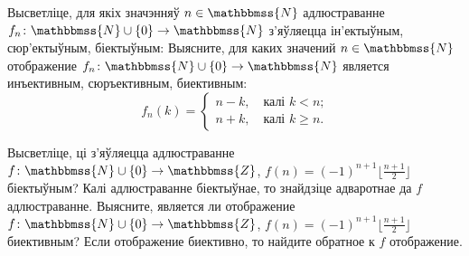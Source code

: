 \begin{problemList}
\bigskip

\problemItemWithCommonPart
{Высветліце, для якіх значэнняў $n \in \mathbbmss{N}$ адлюстраванне $f_n \colon \mathbbmss{N} \cup \{0\} \to \mathbbmss{N}$ з'яўляецца ін'ектыўным, сюр'ектыўным, біектыўным:}
{Выясните, для каких значений $n \in \mathbbmss{N}$ отображение $f_n \colon \mathbbmss{N} \cup \{0\} \to \mathbbmss{N}$ является инъективным, сюръективным, биективным:}
{%
\begin{equation*}
	f_n(k) =
	\begin{cases}
	n - k, \quad \text{калі $k < n$;} \\
	n + k, \quad \text{калі $k \ge n$.}
	\end{cases}
\end{equation*}
}

\medskip

\problemItemSimple
{Высветліце, ці з'яўляецца адлюстраванне $f \colon \mathbbmss{N} \cup \{0\} \to \mathbbmss{Z}$, $f(n) = (-1)^{n + 1}\bigl\lfloor\frac{n + 1}{2}\bigr\rfloor$ біектыўным? Калі адлюстраванне біектыўнае, то знайдзіце адваротнае да $f$ адлюстраванне.}
{Выясните, является ли отображение $f \colon \mathbbmss{N} \cup \{0\} \to \mathbbmss{Z}$, $f(n) = (-1)^{n + 1}\bigl\lfloor\frac{n + 1}{2}\bigr\rfloor$ биективным? Если отображение биективно, то найдите обратное к $f$ отображение.}

\bigskip


\end{problemList}
